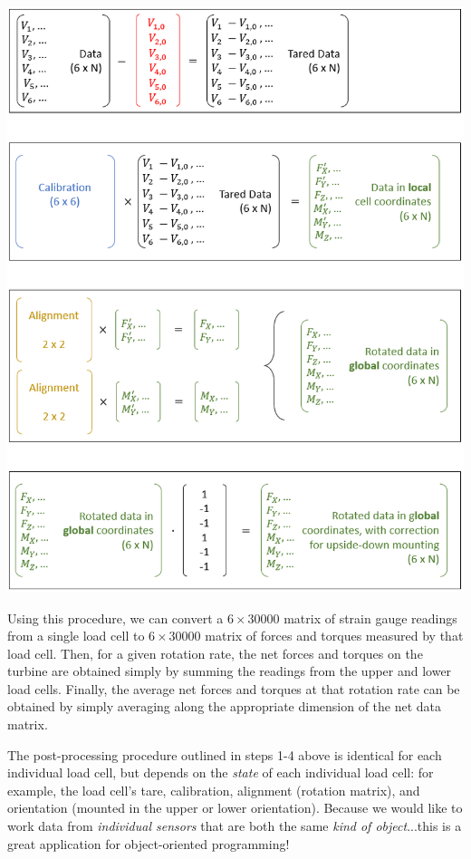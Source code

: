 \documentclass{homework}
\begin{document}
\begin{minipage}{.55\linewidth}
    \includegraphics[width=\linewidth]{dataConversion.PNG}
\end{minipage}

Using this procedure, we can convert a $6\!\times\!30000$ matrix of strain gauge readings from a single load cell to $6\!\times\!30000$ matrix of forces and torques measured by that load cell. Then, for a given rotation rate, the net forces and torques on the turbine are obtained simply by summing the readings from the upper and lower load cells. Finally, the average net forces and torques at that rotation rate can be obtained by simply averaging along the appropriate dimension of the net data matrix.

The post-processing procedure outlined in steps 1-4 above is identical for each individual load cell, but depends on the \textit{state} of each individual load cell: for example, the load cell's tare, calibration, alignment (rotation matrix), and orientation (mounted in the upper or lower orientation). Because we would like to work data from \textit{individual sensors} that are both the same \textit{kind of object}...this is a great application for object-oriented programming!
\end{document}
